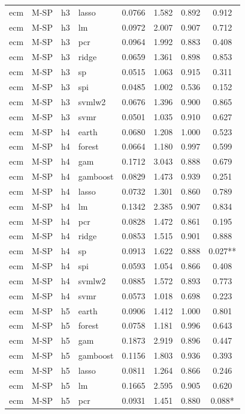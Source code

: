 \begin{ThreePartTable}
\begin{longtable}[t]{llclcccc}
ecm & M-SP & h3 & lasso & 0.0766 & 1.582 & 0.892 & 0.912\\
ecm & M-SP & h3 & lm & 0.0972 & 2.007 & 0.907 & 0.712\\
ecm & M-SP & h3 & pcr & 0.0964 & 1.992 & 0.883 & 0.408\\
ecm & M-SP & h3 & ridge & 0.0659 & 1.361 & 0.898 & 0.853\\
ecm & M-SP & h3 & sp & 0.0515 & 1.063 & 0.915 & 0.311\\
ecm & M-SP & h3 & spi & 0.0485 & 1.002 & 0.536 & 0.152\\
ecm & M-SP & h3 & svmlw2 & 0.0676 & 1.396 & 0.900 & 0.865\\
ecm & M-SP & h3 & svmr & 0.0501 & 1.035 & 0.910 & 0.627\\
\addlinespace
ecm & M-SP & h4 & earth & 0.0680 & 1.208 & 1.000 & 0.523\\
ecm & M-SP & h4 & forest & 0.0664 & 1.180 & 0.997 & 0.599\\
ecm & M-SP & h4 & gam & 0.1712 & 3.043 & 0.888 & 0.679\\
ecm & M-SP & h4 & gamboost & 0.0829 & 1.473 & 0.939 & 0.251\\
ecm & M-SP & h4 & lasso & 0.0732 & 1.301 & 0.860 & 0.789\\
ecm & M-SP & h4 & lm & 0.1342 & 2.385 & 0.907 & 0.834\\
ecm & M-SP & h4 & pcr & 0.0828 & 1.472 & 0.861 & 0.195\\
ecm & M-SP & h4 & ridge & 0.0853 & 1.515 & 0.901 & 0.888\\
ecm & M-SP & h4 & sp & 0.0913 & 1.622 & 0.888 & 0.027**\\
ecm & M-SP & h4 & spi & 0.0593 & 1.054 & 0.866 & 0.408\\
ecm & M-SP & h4 & svmlw2 & 0.0885 & 1.572 & 0.893 & 0.773\\
ecm & M-SP & h4 & svmr & 0.0573 & 1.018 & 0.698 & 0.223\\
\addlinespace
ecm & M-SP & h5 & earth & 0.0906 & 1.412 & 1.000 & 0.801\\
ecm & M-SP & h5 & forest & 0.0758 & 1.181 & 0.996 & 0.643\\
ecm & M-SP & h5 & gam & 0.1873 & 2.919 & 0.896 & 0.447\\
ecm & M-SP & h5 & gamboost & 0.1156 & 1.803 & 0.936 & 0.393\\
ecm & M-SP & h5 & lasso & 0.0811 & 1.264 & 0.866 & 0.246\\
ecm & M-SP & h5 & lm & 0.1665 & 2.595 & 0.905 & 0.620\\
ecm & M-SP & h5 & pcr & 0.0931 & 1.451 & 0.880 & 0.088*\\

\end{longtable}
\end{ThreePartTable}
